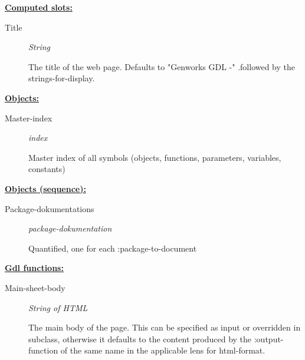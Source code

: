 \documentclass [11pt]{book}
\begin{document}
\begin{itemize}
\textbf{
\underline{Computed slots:}}

\begin{description}

\item [Title]
\emph{String}

 The title of the web page. Defaults to "Genworks GDL -"
.followed by the strings-for-display.




\end{description}






\textbf{
\underline{Objects:}}

\begin{description}

\item [Master-index]
\emph{index}

 Master index of all symbols (objects, functions, parameters, variables, constants)




\end{description}






\textbf{
\underline{Objects (sequence):}}

\begin{description}

\item [Package-dokumentations]
\emph{package-dokumentation}

 Quantified, one for each :package-to-document




\end{description}






\textbf{
\underline{Gdl functions:}}

\begin{description}

\item [Main-sheet-body]
\emph{String of HTML}

 The main body of the page.
This can be specified as input or overridden in subclass, otherwise it defaults
to the content produced by the :output-function of the same name
in the applicable lens for  html-format.





\end{description}
\end{itemize}
\end{document}
